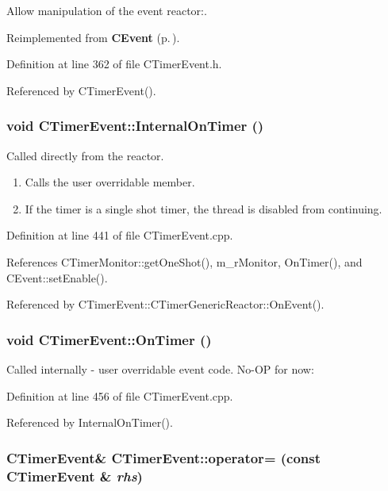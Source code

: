 Allow manipulation of the event reactor:.



Reimplemented from {\bf CEvent} {\rm (p.\,\pageref{classCEvent_a9})}.

Definition at line 362 of file CTimer\-Event.h.

Referenced by CTimer\-Event().
\subsubsection{\setlength{\rightskip}{0pt plus 5cm}void CTimer\-Event::Internal\-On\-Timer ()}\label{classCTimerEvent_a11}


Called directly from the reactor. \begin{enumerate}
\item 
Calls the user overridable member.\item 
If the timer is a single shot timer, the thread is disabled from continuing. \end{enumerate}


Definition at line 441 of file CTimer\-Event.cpp.

References CTimer\-Monitor::get\-One\-Shot(), m\_\-r\-Monitor, On\-Timer(), and CEvent::set\-Enable().

Referenced by CTimer\-Event::CTimer\-Generic\-Reactor::On\-Event().
\subsubsection{\setlength{\rightskip}{0pt plus 5cm}void CTimer\-Event::On\-Timer ()\hspace{0.3cm}{\tt  [virtual]}}\label{classCTimerEvent_a10}


Called internally - user overridable event code. No-OP for now: 

Definition at line 456 of file CTimer\-Event.cpp.

Referenced by Internal\-On\-Timer().
\subsubsection{\setlength{\rightskip}{0pt plus 5cm}CTimer\-Event\& CTimer\-Event::operator= (const CTimer\-Event \& {\em rhs})\hspace{0.3cm}{\tt  [private]}}\label{classCTimerEvent_c1}


